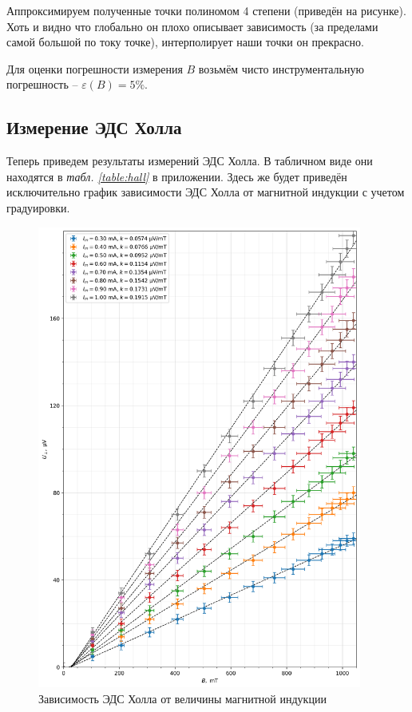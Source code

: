 \documentclass[12pt, a4paper]{article}
\begin{document}
Аппроксимируем полученные точки полиномом 4 степени (приведён на рисунке). Хоть и видно что глобально он плохо описывает зависимость
(за пределами самой большой по току точке), интерполирует наши точки он прекрасно.

Для оценки погрешности измерения $B$ возьмём чисто инструментальную погрешность -- ${\varepsilon(B) = 5 \%}$.

\subsection{Измерение ЭДС Холла}
Теперь приведем результаты измерений ЭДС Холла. В табличном виде они находятся в
\textit{табл. \ref{table:hall}} в приложении. Здесь же будет приведён исключительно график зависимости ЭДС Холла от магнитной индукции
с учетом градуировки.
\newpage
\begin{figure}[H]
  \includegraphics[width=0.95\textwidth]{pics/second_part.png}
  \caption{Зависимость ЭДС Холла от величины магнитной индукции}
\end{figure}
\newpage
\end{document}
